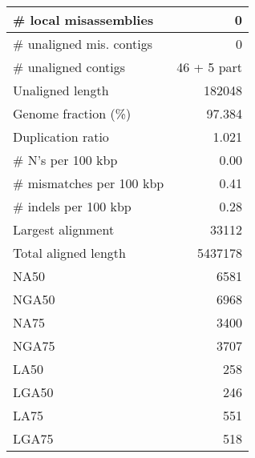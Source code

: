 \documentclass[12pt,a4paper]{article}
\begin{document}
\begin{table}[ht]
\begin{center}
\begin{tabular}{|l*{1}{|r}|}
\# local misassemblies & 0 \\ \hline
\# unaligned mis. contigs & 0 \\ \hline
\# unaligned contigs & 46 + 5 part \\ \hline
Unaligned length & 182048 \\ \hline
Genome fraction (\%) & 97.384 \\ \hline
Duplication ratio & 1.021 \\ \hline
\# N's per 100 kbp & 0.00 \\ \hline
\# mismatches per 100 kbp & 0.41 \\ \hline
\# indels per 100 kbp & 0.28 \\ \hline
Largest alignment & 33112 \\ \hline
Total aligned length & 5437178 \\ \hline
NA50 & 6581 \\ \hline
NGA50 & 6968 \\ \hline
NA75 & 3400 \\ \hline
NGA75 & 3707 \\ \hline
LA50 & 258 \\ \hline
LGA50 & 246 \\ \hline
LA75 & 551 \\ \hline
LGA75 & 518 \\ \hline
\end{tabular}
\end{center}
\end{table}
\end{document}
